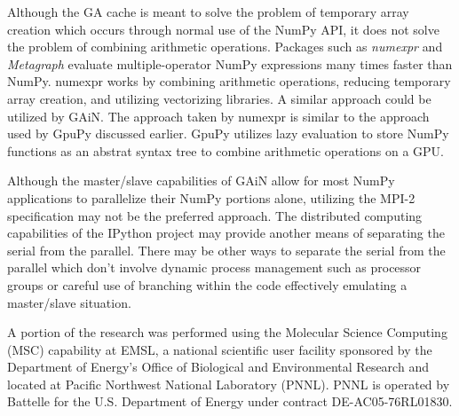 \documentclass[preprint]{sigplanconf}
\begin{document}
Although the GA cache is meant to solve the problem of temporary array
creation which occurs through normal use of the NumPy API,  it does not solve
the problem of combining arithmetic operations. Packages such as
\emph{numexpr} \cite{Coo11} and \emph{Metagraph} \cite{Wan11} evaluate
multiple-operator NumPy expressions many times faster than NumPy. numexpr
works by combining arithmetic operations, reducing temporary array creation,
and utilizing vectorizing libraries. A similar approach could be utilized by
GAiN. The approach taken by numexpr is similar to the approach used by GpuPy
discussed earlier. GpuPy utilizes lazy evaluation to store NumPy functions as
an abstrat syntax tree to combine arithmetic operations on a GPU.

Although the master/slave capabilities of GAiN allow for most NumPy
applications to parallelize their NumPy portions alone, utilizing the MPI-2
specification may not be the preferred approach. The distributed computing
capabilities of the IPython project may provide another means of separating
the serial from the parallel. There may be other ways to separate the serial
from the parallel which don't involve dynamic process management such as
processor groups or careful use of branching within the code effectively
emulating a master/slave situation.

%

\acks

A portion of the research was performed using the Molecular Science Computing
(MSC) capability at EMSL, a national scientific user facility sponsored by the
Department of Energy’s Office of Biological and Environmental Research and
located at Pacific Northwest National Laboratory (PNNL). PNNL is operated by
Battelle for the U.S. Department of Energy under contract DE-AC05-76RL01830.





\end{document}
